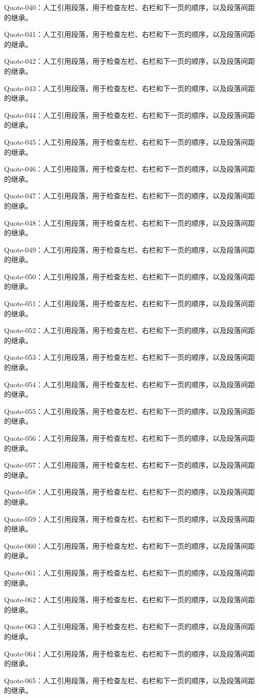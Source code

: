 \documentclass{article}
\begin{document}
\begin{quoteblock}
Quote-040：人工引用段落，用于检查左栏、右栏和下一页的顺序，以及段落间距的继承。

Quote-041：人工引用段落，用于检查左栏、右栏和下一页的顺序，以及段落间距的继承。

Quote-042：人工引用段落，用于检查左栏、右栏和下一页的顺序，以及段落间距的继承。

Quote-043：人工引用段落，用于检查左栏、右栏和下一页的顺序，以及段落间距的继承。

Quote-044：人工引用段落，用于检查左栏、右栏和下一页的顺序，以及段落间距的继承。

Quote-045：人工引用段落，用于检查左栏、右栏和下一页的顺序，以及段落间距的继承。

Quote-046：人工引用段落，用于检查左栏、右栏和下一页的顺序，以及段落间距的继承。

Quote-047：人工引用段落，用于检查左栏、右栏和下一页的顺序，以及段落间距的继承。

Quote-048：人工引用段落，用于检查左栏、右栏和下一页的顺序，以及段落间距的继承。

Quote-049：人工引用段落，用于检查左栏、右栏和下一页的顺序，以及段落间距的继承。

Quote-050：人工引用段落，用于检查左栏、右栏和下一页的顺序，以及段落间距的继承。

Quote-051：人工引用段落，用于检查左栏、右栏和下一页的顺序，以及段落间距的继承。

Quote-052：人工引用段落，用于检查左栏、右栏和下一页的顺序，以及段落间距的继承。

Quote-053：人工引用段落，用于检查左栏、右栏和下一页的顺序，以及段落间距的继承。

Quote-054：人工引用段落，用于检查左栏、右栏和下一页的顺序，以及段落间距的继承。

Quote-055：人工引用段落，用于检查左栏、右栏和下一页的顺序，以及段落间距的继承。

Quote-056：人工引用段落，用于检查左栏、右栏和下一页的顺序，以及段落间距的继承。

Quote-057：人工引用段落，用于检查左栏、右栏和下一页的顺序，以及段落间距的继承。

Quote-058：人工引用段落，用于检查左栏、右栏和下一页的顺序，以及段落间距的继承。

Quote-059：人工引用段落，用于检查左栏、右栏和下一页的顺序，以及段落间距的继承。

Quote-060：人工引用段落，用于检查左栏、右栏和下一页的顺序，以及段落间距的继承。

Quote-061：人工引用段落，用于检查左栏、右栏和下一页的顺序，以及段落间距的继承。

Quote-062：人工引用段落，用于检查左栏、右栏和下一页的顺序，以及段落间距的继承。

Quote-063：人工引用段落，用于检查左栏、右栏和下一页的顺序，以及段落间距的继承。

Quote-064：人工引用段落，用于检查左栏、右栏和下一页的顺序，以及段落间距的继承。

Quote-065：人工引用段落，用于检查左栏、右栏和下一页的顺序，以及段落间距的继承。
\end{quoteblock}
\end{document}
